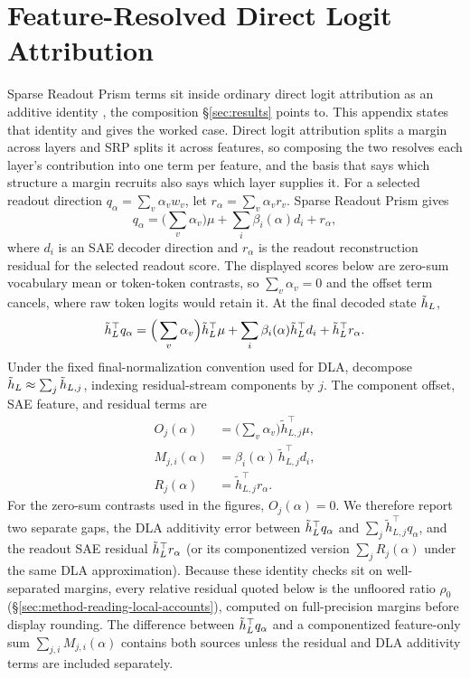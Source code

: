 \section{Feature-Resolved Direct Logit Attribution}
\label{app:feature-resolved-dla}

Sparse Readout Prism terms sit inside ordinary direct logit attribution as
an additive identity
\citep{elhage2021framework,wang2022ioi,nguyen2024logitprisms}, the
composition \S\ref{sec:results} points to. This appendix states that
identity and gives the worked case. Direct logit attribution splits a
margin across layers and SRP splits it across features, so composing the
two resolves each layer's contribution into one term per feature, and the
basis that says which structure a margin recruits also says which layer
supplies it. For a selected readout direction
\(q_\alpha=\sum_v \alpha_v w_v\), let
\(r_\alpha=\sum_v\alpha_v r_v\). Sparse Readout Prism gives
\[
    q_\alpha = \Big(\sum_v\alpha_v\Big)\mu+\sum_i \beta_i(\alpha)d_i + r_\alpha ,
\]
where \(d_i\) is an SAE decoder direction and \(r_\alpha\) is the readout
reconstruction residual for the selected readout score. The displayed scores
below are zero-sum vocabulary mean or token-token contrasts, so \(\sum_v\alpha_v=0\)
and the offset term cancels, where raw token logits would retain it. At the
final decoded state \(\tilde h_L\),
\[
    \tilde h_L^\top q_\alpha
    =
    \Big(\sum_v\alpha_v\Big) \tilde h_L^\top\mu
    +
    \sum_i \beta_i(\alpha)\tilde h_L^\top d_i
    +
    \tilde h_L^\top r_\alpha .
\]
Under the fixed final-normalization convention used for DLA, decompose
\(\tilde h_L\approx\sum_j \tilde h_{L,j}\), indexing residual-stream
components by \(j\). The component offset, SAE
feature, and residual terms
are
\[
    \begin{aligned}
    O_j(\alpha)&=\Big(\textstyle\sum_v\alpha_v\Big)\tilde h_{L,j}^\top\mu,\\
    M_{j,i}(\alpha)&=\beta_i(\alpha)\,\tilde h_{L,j}^\top d_i,\\
    R_j(\alpha)&=\tilde h_{L,j}^\top r_\alpha .
    \end{aligned}
\]
For the zero-sum contrasts used in the figures, \(O_j(\alpha)=0\). We therefore report
two separate gaps, the DLA additivity error between \(\tilde h_L^\top q_\alpha\) and
\(\sum_j \tilde h_{L,j}^\top q_\alpha\), and the readout SAE residual
\(\tilde h_L^\top r_\alpha\) (or its
componentized version \(\sum_j R_j(\alpha)\) under the same DLA approximation).
Because these identity checks sit on well-separated margins, every relative
residual quoted below is the unfloored ratio \(\rho_0\)
(\S\ref{sec:method-reading-local-accounts}), computed on full-precision
margins before display rounding.
The difference between \(\tilde h_L^\top q_\alpha\) and a componentized feature-only sum
\(\sum_{j,i}M_{j,i}(\alpha)\) contains both sources unless the residual and DLA
additivity terms are included separately.

